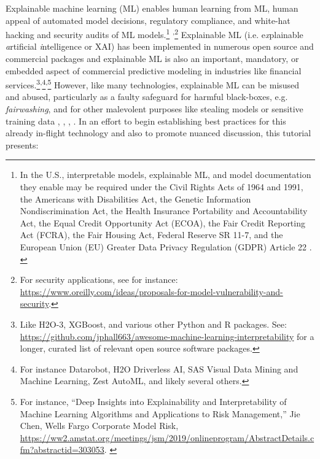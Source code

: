 \documentclass[sigconf]{acmart}
\begin{document}
Explainable machine learning (ML) enables human learning from ML, human appeal of automated model decisions, regulatory compliance, and white-hat hacking and security audits of ML models.\footnote{In the U.S., interpretable models, explainable ML, and model documentation they enable may be required under the Civil Rights Acts of 1964 and 1991, the Americans with Disabilities Act, the Genetic Information Nondiscrimination Act, the Health Insurance Portability and Accountability Act, the Equal Credit Opportunity Act (ECOA), the Fair Credit Reporting Act (FCRA), the Fair Housing Act, Federal Reserve SR 11-7, and the European Union (EU) Greater Data Privacy Regulation (GDPR) Article 22 \cite{ff_interpretability}. \label{fn:regs}} \textsuperscript{,}\footnote{For security applications, see for instance: \url{https://www.oreilly.com/ideas/proposals-for-model-vulnerability-and-security}.\label{fn:regs}} Explainable ML (i.e. e\textit{x}plainable \textit{a}rtificial \textit{i}ntelligence or XAI) has been implemented in numerous open source and commercial packages and explainable ML is also an important, mandatory, or embedded aspect of commercial predictive modeling in industries like financial services.\footnote{Like H2O-3, XGBoost, and various other Python and R packages. See: \url{https://github.com/jphall663/awesome-machine-learning-interpretability} for a longer, curated list of relevant open source software packages.}\textsuperscript{,}\footnote{For instance  Datarobot, H2O Driverless AI, SAS Visual Data Mining and Machine Learning, Zest AutoML, and likely several others.}\textsuperscript{,}\footnote{For instance, ``Deep Insights into Explainability and Interpretability of Machine Learning Algorithms and Applications to Risk Management,'' Jie Chen, Wells Fargo Corporate Model Risk, \url{https://ww2.amstat.org/meetings/jsm/2019/onlineprogram/AbstractDetails.cfm?abstractid=303053}. \label{fn:Chen}} However, like many technologies, explainable ML can be misused and abused, particularly as a faulty safeguard for harmful black-boxes, e.g. \textit{fairwashing}, and for other malevolent purposes like stealing models or sensitive training data \cite{fair_washing}, \cite{please_stop}, \cite{membership_inference}, \cite{model_stealing}. In an effort to begin establishing best practices for this already in-flight technology and also to promote nuanced discussion, this tutorial presents:\\
\end{document}
